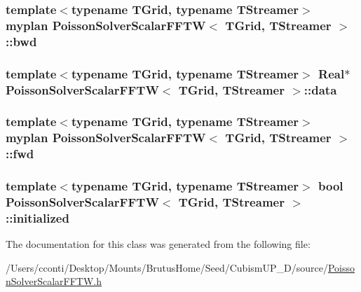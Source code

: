 \subsubsection[{bwd}]{\setlength{\rightskip}{0pt plus 5cm}template$<$typename T\+Grid, typename T\+Streamer$>$ {\bf myplan} {\bf Poisson\+Solver\+Scalar\+F\+F\+T\+W}$<$ T\+Grid, T\+Streamer $>$\+::bwd\hspace{0.3cm}{\ttfamily [protected]}}\label{class_poisson_solver_scalar_f_f_t_w_a01d910395049c4252d4924baa032b13d}
\hypertarget{class_poisson_solver_scalar_f_f_t_w_ae4f5219ed358cd8d227084a7fa92e686}{}
\subsubsection[{data}]{\setlength{\rightskip}{0pt plus 5cm}template$<$typename T\+Grid, typename T\+Streamer$>$ {\bf Real}$\ast$ {\bf Poisson\+Solver\+Scalar\+F\+F\+T\+W}$<$ T\+Grid, T\+Streamer $>$\+::data\hspace{0.3cm}{\ttfamily [protected]}}\label{class_poisson_solver_scalar_f_f_t_w_ae4f5219ed358cd8d227084a7fa92e686}
\hypertarget{class_poisson_solver_scalar_f_f_t_w_a7773ce95a3312d7a5213c060586aed4b}{}
\subsubsection[{fwd}]{\setlength{\rightskip}{0pt plus 5cm}template$<$typename T\+Grid, typename T\+Streamer$>$ {\bf myplan} {\bf Poisson\+Solver\+Scalar\+F\+F\+T\+W}$<$ T\+Grid, T\+Streamer $>$\+::fwd\hspace{0.3cm}{\ttfamily [protected]}}\label{class_poisson_solver_scalar_f_f_t_w_a7773ce95a3312d7a5213c060586aed4b}
\hypertarget{class_poisson_solver_scalar_f_f_t_w_a14ffa693193fcc1d5391c452dcf11d34}{}
\subsubsection[{initialized}]{\setlength{\rightskip}{0pt plus 5cm}template$<$typename T\+Grid, typename T\+Streamer$>$ bool {\bf Poisson\+Solver\+Scalar\+F\+F\+T\+W}$<$ T\+Grid, T\+Streamer $>$\+::initialized\hspace{0.3cm}{\ttfamily [protected]}}\label{class_poisson_solver_scalar_f_f_t_w_a14ffa693193fcc1d5391c452dcf11d34}


The documentation for this class was generated from the following file\+:\begin{DoxyCompactItemize}
\item 
/\+Users/cconti/\+Desktop/\+Mounts/\+Brutus\+Home/\+Seed/\+Cubism\+U\+P\+\_\+D/source/\hyperlink{_poisson_solver_scalar_f_f_t_w_8h}{Poisson\+Solver\+Scalar\+F\+F\+T\+W.\+h}\end{DoxyCompactItemize}
